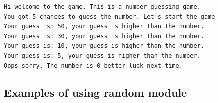 \documentclass[11pt]{article}
\begin{document}
    \begin{Verbatim}[commandchars=\\\{\}]
Hi welcome to the game, This is a number guessing game.
You got 5 chances to guess the number. Let's start the game
Your guess is: 50, your guess is higher than the number.
Your guess is: 30, your guess is higher than the number.
Your guess is: 10, your guess is higher than the number.
Your guess is: 5, your guess is higher than the number.
Oops sorry, The number is 0 better luck next time.
    \end{Verbatim}

    \subsection{Examples of using random module}\label{examples-of-using-random-module}
\end{document}
